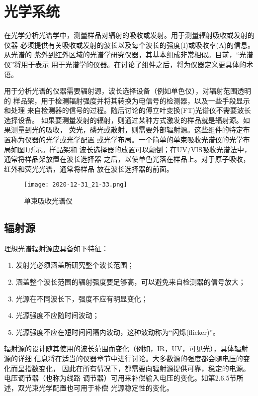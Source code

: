 \section{光学系统}
在光学分析光谱学中，测量样品对辐射的吸收或发射。用于测量辐射吸收或发射的仪器
必须提供有关吸收或发射的波长以及每个波长的强度(I)或吸收率(A)的信息。从光谱的
紫外到红外区域的光谱学研究仪器，其基本组成非常相似。目前，“光谱仪”将用于表示
用于光谱学的仪器。在讨论了组件之后，将为仪器定义更具体的术语。

用于分析光谱的仪器需要辐射源，波长选择设备（例如单色仪），对辐射范围透明的
样品架，用于检测辐射强度并将其转换为电信号的检测器，以及一些手段显示和处理
来自检测器的信号的过程。随后讨论的傅立叶变换(FT)光谱仪不需要波长选择设备。
如果要测量发射的辐射，则通过某种方式激发的样品就是辐射源。如果测量到光的吸收，
荧光，磷光或散射，则需要外部辐射源。这些组件的特定布置称为仪器的光学或光学配置
或光学布局。一个简单的单束吸收光谱仪的光学布局如图\ref{fig:2.17}所示。样品架和
波长选择器的放置可以颠倒；在UV/VIS吸收光谱法中，通常将样品架放置在波长选择器
之后，以使单色光落在样品上。对于原子吸收，红外和荧光光谱，通常将样品
放在波长选择器的前面。
\begin{figure}[htpb]
    \centering
    \texttt{[image: 2020-12-31\_21-33.png]}
    \caption{单束吸收光谱仪}
    \label{fig:2.17}
\end{figure}
\subsection{辐射源}
理想光谱辐射源应具备如下特征：
\begin{enumerate}
    \item 发射光必须涵盖所研究整个波长范围；
    \item 涵盖整个波长范围的辐射强度要足够高，可以避免来自检测器的信号放大；
    \item 光源在不同波长下，强度不应有明显变化；
    \item 光源强度不应随时间波动；
    \item 光源强度不应在短时间间隔内波动，这种波动称为“闪烁(flicker)”。
\end{enumerate}

辐射源的设计随其使用的波长范围而变化（例如，IR，UV，可见光），具体辐射源的详细
信息将在适当的仪器章节中进行讨论。大多数源的强度都会随电压的变化而呈指数变化，
因此在所有情况下，都需要向辐射源提供可靠，稳定的电源。电压调节器（也称为线路
调节器）可用来补偿输入电压的变化。如第2.6.5节所述，双光束光学配置也可用于补偿
光源稳定性的变化。

